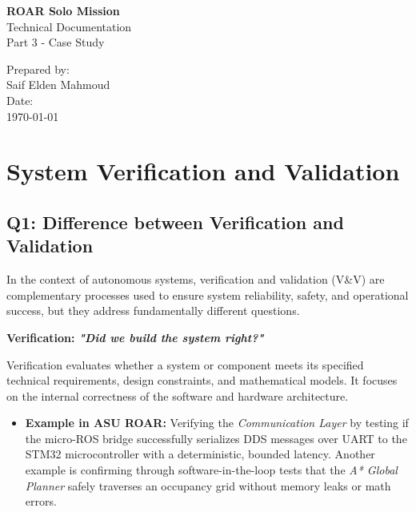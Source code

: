 \documentclass[12pt,a4paper]{article}
\begin{document}
\begin{titlepage}
    \centering
    \vspace*{2cm}
    
    {\Huge\bfseries ROAR Solo Mission}\\[0.5cm]
    {\LARGE Technical Documentation}\\[0.5cm]
    {\LARGE Part 3 - Case Study}\\[3cm]
    
    \vfill
    
    {\Large Prepared by:}\\[0.5cm]
    {\large Saif Elden Mahmoud}\\[3cm]
    
    {\Large Date:}\\[0.5cm]
    {\large \today}
    
    \vfill
    
\end{titlepage}

\tableofcontents
\newpage

\section{System Verification and Validation}

\subsection{Q1: Difference between Verification and Validation}

In the context of autonomous systems, verification and validation (V\&V) are complementary processes used to ensure system reliability, safety, and operational success, but they address fundamentally different questions.

\noindent\textbf{Verification: \textit{"Did we build the system right?"}}

Verification evaluates whether a system or component meets its specified technical requirements, design constraints, and mathematical models. It focuses on the internal correctness of the software and hardware architecture.

\begin{itemize}[leftmargin=*]
    \item \textbf{Example in ASU ROAR:} Verifying the \textit{Communication Layer} by testing if the micro-ROS bridge successfully serializes DDS messages over UART to the STM32 microcontroller with a deterministic, bounded latency. Another example is confirming through software-in-the-loop tests that the \textit{A* Global Planner} safely traverses an occupancy grid without memory leaks or math errors.
\end{itemize}
\end{document}
